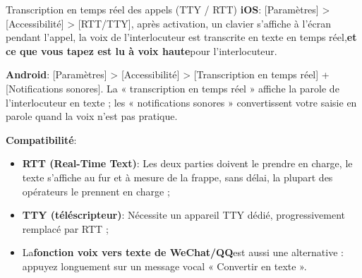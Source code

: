 \begin{tcbinfo}{Transcription en temps réel des appels (TTY / RTT)}
\textbf{iOS}: [Paramètres] > [Accessibilité] > [RTT/TTY], après activation, un clavier s'affiche à l'écran pendant l'appel, la voix de l'interlocuteur est transcrite en texte en temps réel,\textbf{et ce que vous tapez est lu à voix haute}pour l'interlocuteur.

\textbf{Android}: [Paramètres] > [Accessibilité] > [Transcription en temps réel] + [Notifications sonores]. La « transcription en temps réel » affiche la parole de l'interlocuteur en texte ; les « notifications sonores » convertissent votre saisie en parole quand la voix n'est pas pratique.

\textbf{Compatibilité}:

\begin{itemize}
  \item \textbf{RTT (Real-Time Text)}: Les deux parties doivent le prendre en charge, le texte s'affiche au fur et à mesure de la frappe, sans délai, la plupart des opérateurs le prennent en charge ;
  \item \textbf{TTY (téléscripteur)}: Nécessite un appareil TTY dédié, progressivement remplacé par RTT ;
  \item La\textbf{fonction voix vers texte de WeChat/QQ}est aussi une alternative : appuyez longuement sur un message vocal « Convertir en texte ».
\end{itemize}

\end{tcbinfo}


